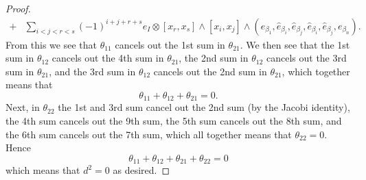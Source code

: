 \begin{proof}
\begin{align*}
  +&\sum_{i < j <r < s }(-1)^{i + j + r + s} e_{I} \otimes [x_r, x_s] \wedge [x_i, x_j]  \wedge(e_{\beta_1}, \widehat{e}_{\beta_i}, \widehat{e}_{\beta_j}, \widehat{e}_{\beta_i}, \widehat{e}_{\beta_j}, e_{\beta_n}).
  \end{align*}
  From this we see that $ \theta_{11} $ cancels out the 1st sum in $ \theta_{21} $. We then see that the 1st sum in $ \theta_{12} $ cancels out the 4th sum in $ \theta_{21} $, the 2nd sum in $ \theta_{12} $ cancels out the 3rd sum in $ \theta_{21} $, and the 3rd sum in $ \theta_{12} $ cancels out the 2nd sum in $ \theta_{21} $, which together means that
  \begin{equation}
    \theta_{11} + \theta_{12} + \theta_{21} = 0.
  \end{equation}
  Next, in $ \theta_{22} $ the 1st and 3rd sum cancel out the 2nd sum (by the Jacobi identity), the 4th sum cancels out the 9th sum, the 5th sum cancels out the 8th sum, and the 6th sum cancels out the 7th sum, which all together means that $ \theta_{22} = 0 $. Hence
  \begin{equation}
    \theta_{11} + \theta_{12} + \theta_{21} + \theta_{22} = 0
  \end{equation}
  which means that $ d^2 = 0 $ as desired.
\end{proof}

